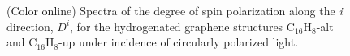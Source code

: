 \documentclass[pss]{wiley2sp} %
\begin{document}
\begin{figure}[t]
\hfill
{}
\caption{(Color online) Spectra of the degree of spin polarization along
    the \emph{i} direction, {$D^{i}$}, for the hydrogenated graphene structures
    C$_{16}$H$_{8}$-alt and C$_{16}$H$_{8}$-up under
    incidence of circularly polarized light.\label{fig:Da}}
\end{figure}
\end{document}
